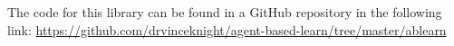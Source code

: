 \label{app:codemodules}

The code for this library can be found in a GitHub repository in the following link:
\url{https://github.com/drvinceknight/agent-based-learn/tree/master/ablearn}
